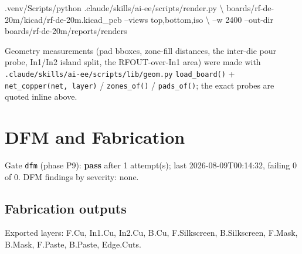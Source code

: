 \documentclass[11pt,a4paper]{article}
\begin{document}
.venv/Scripts/python .claude/skills/ai-ee/scripts/render.py \textbackslash{} boards/rf-de-20m/kicad/rf-de-20m.kicad\_pcb --views top,bottom,iso \textbackslash{} --w 2400 --out-dir boards/rf-de-20m/reports/renders

Geometry measurements (pad bboxes, zone-fill distances, the inter-die pour probe, In1/In2 island split, the RFOUT-over-In1 area) were made with \texttt{.claude/skills/ai-ee/scripts/lib/geom.py} \texttt{load\_board()} + \texttt{net\_copper(net, layer)} / \texttt{zones\_of()} / \texttt{pads\_of()}; the exact probes are quoted inline above.

\section{DFM and Fabrication}
Gate \texttt{dfm} (phase P9): \textbf{pass} after 1 attempt(s); last 2026-08-09T00:14:32, failing 0 of 0.
DFM findings by severity: none.
\subsection*{Fabrication outputs}
Exported layers: F.Cu, In1.Cu, In2.Cu, B.Cu, F.Silkscreen, B.Silkscreen, F.Mask, B.Mask, F.Paste, B.Paste, Edge.Cuts.
\end{document}
